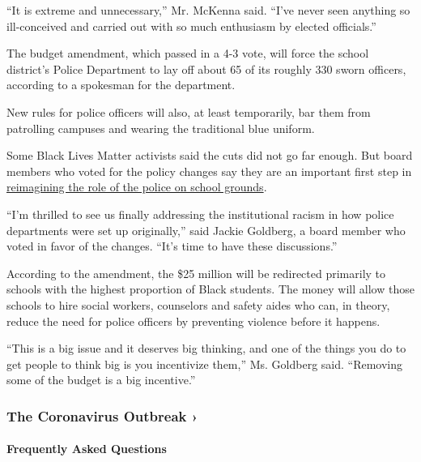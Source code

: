 ``It is extreme and unnecessary,'' Mr. McKenna said. ``I've never seen
anything so ill-conceived and carried out with so much enthusiasm by
elected officials.''

The budget amendment, which passed in a 4-3 vote, will force the school
district's Police Department to lay off about 65 of its roughly 330
sworn officers, according to a spokesman for the department.

New rules for police officers will also, at least temporarily, bar them
from patrolling campuses and wearing the traditional blue uniform.

Some Black Lives Matter activists said the cuts did not go far enough.
But board members who voted for the policy changes say they are an
important first step in
\href{https://www.nytimes.com/2020/06/12/us/schools-police-resource-officers.html}{reimagining
the role of the police on school grounds}.

``I'm thrilled to see us finally addressing the institutional racism in
how police departments were set up originally,'' said Jackie Goldberg, a
board member who voted in favor of the changes. ``It's time to have
these discussions.''

According to the amendment, the \$25 million will be redirected
primarily to schools with the highest proportion of Black students. The
money will allow those schools to hire social workers, counselors and
safety aides who can, in theory, reduce the need for police officers by
preventing violence before it happens.

``This is a big issue and it deserves big thinking, and one of the
things you do to get people to think big is you incentivize them,'' Ms.
Goldberg said. ``Removing some of the budget is a big incentive.''

\href{https://www.nytimes.com/news-event/coronavirus?action=click\&pgtype=Article\&state=default\&region=MAIN_CONTENT_3\&context=storylines_faq}{}

\hypertarget{the-coronavirus-outbreak-}{%
\subsubsection{The Coronavirus Outbreak
›}\label{the-coronavirus-outbreak-}}

\hypertarget{frequently-asked-questions}{%
\paragraph{Frequently Asked
Questions}\label{frequently-asked-questions}}

